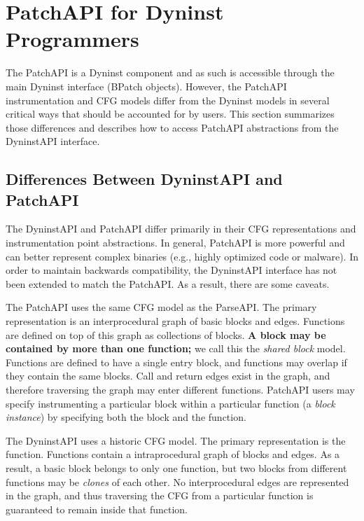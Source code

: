 \appendix
\section{PatchAPI for Dyninst Programmers} 
\label{sec-dyn}

The PatchAPI is a Dyninst component and as such is accessible through
the main Dyninst interface (BPatch objects). However, the PatchAPI
instrumentation and CFG models differ from the Dyninst models in
several critical ways that should be accounted for by users. This
section summarizes those differences and describes how to access
PatchAPI abstractions from the DyninstAPI interface. 

\subsection{Differences Between DyninstAPI and PatchAPI}

The DyninstAPI and PatchAPI differ primarily in their CFG
representations and instrumentation point abstractions. In general,
PatchAPI is more powerful and can better represent complex binaries
(e.g., highly optimized code or malware). In order to maintain
backwards compatibility, the DyninstAPI interface has not been
extended to match the PatchAPI. As a result, there are some caveats. 

The PatchAPI uses the same CFG model as the ParseAPI. The primary
representation is an interprocedural graph of basic blocks and
edges. Functions are defined on top of this graph as collections of
blocks. \textbf{A block may be contained by more than one function;}
we call this the \emph{shared block} model. Functions are defined to
have a single entry block, and functions may overlap if they contain
the same blocks. Call and return edges exist in the graph, and
therefore traversing the graph may enter different functions. PatchAPI
users may specify instrumenting a particular block within a particular
function (a \emph{block instance}) by specifying both the block and
the function. 

The DyninstAPI uses a historic CFG model. The primary representation
is the function. Functions contain a intraprocedural graph of blocks
and edges. As a result, a basic block belongs to only one function,
but two blocks from different functions may be \emph{clones} of each
other. No interprocedural edges are represented in the graph, and thus
traversing the CFG from a particular function is guaranteed to remain
inside that function. 

